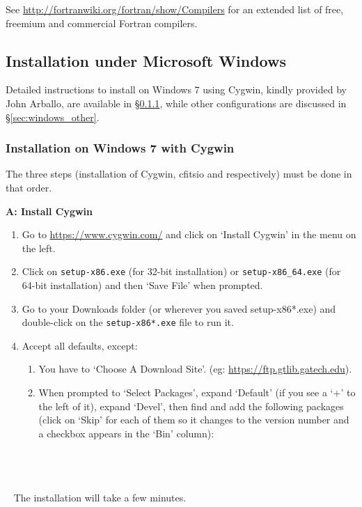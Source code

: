 \documentclass[12pt,twoside]{article}
\begin{document}
See \url{http://fortranwiki.org/fortran/show/Compilers} for an extended list of free, freemium and commercial Fortran compilers.

\subsection{Installation under Microsoft Windows}
\label{sec:windows}
Detailed instructions to install \healpix on Windows 7 using Cygwin, kindly provided by John Arballo, 
are available in \S\ref{sec:windows_seven}, 
while other configurations are discussed in \S\ref{sec:windows_other}.
\subsubsection{Installation on Windows 7 with Cygwin}
\label{sec:windows_seven}
The three steps (installation of Cygwin, cfitsio and \healpix respectively) must be done in that order.

\textbf{A: Install Cygwin}
\begin{enumerate}
	\setlength{\itemsep}{-1pt}
	\setlength{\parsep}{-10pt}
\item Go to \url{https://www.cygwin.com/}
and click on `Install Cygwin' in the menu on the left.

\item Click on \texttt{setup-x86.exe} (for 32-bit installation) or 
\texttt{setup-x86\_64.exe}
(for 64-bit installation) and then `Save File' when prompted.

\item Go to your Downloads folder (or wherever you saved setup-x86*.exe) and
double-click on the \texttt{setup-x86*.exe} file to run it.

\item Accept all defaults, except:

\begin{enumerate}
	\setlength{\itemsep}{-1pt}
	\setlength{\parsep}{-10pt}
\item
  You have to `Choose A Download Site'. (eg:
  \url{https://ftp.gtlib.gatech.edu}).
\item
  When prompted to `Select Packages', expand `Default' (if you see a `+'
  to the left of it), expand `Devel', then find and add the following
  packages (click on `Skip' for each of them so it changes to the
  version number and a checkbox appears in the `Bin' column):\\
 \\
 \\
 \\
\end{enumerate}
\end{enumerate}
~ The installation will take a few minutes.
\end{document}
